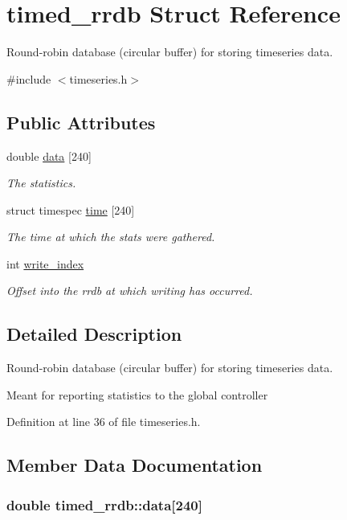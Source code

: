 \hypertarget{structtimed__rrdb}{\section{timed\-\_\-rrdb Struct Reference}
\label{structtimed__rrdb}
}


Round-\/robin database (circular buffer) for storing timeseries data.  




{\ttfamily \#include $<$timeseries.\-h$>$}

\subsection*{Public Attributes}
\begin{DoxyCompactItemize}
\item 
double \hyperlink{structtimed__rrdb_af2d8f1edb6d62eb38ce97d8f65570182}{data} \mbox{[}240\mbox{]}
\begin{DoxyCompactList}\small\item\em The statistics. \end{DoxyCompactList}\item 
struct timespec \hyperlink{structtimed__rrdb_abcf16b68b8b0bb8eb6a3c1e266b4c2f8}{time} \mbox{[}240\mbox{]}
\begin{DoxyCompactList}\small\item\em The time at which the stats were gathered. \end{DoxyCompactList}\item 
int \hyperlink{structtimed__rrdb_ab0c1ce0ef397283f1f93ed5d03583bab}{write\-\_\-index}
\begin{DoxyCompactList}\small\item\em Offset into the rrdb at which writing has occurred. \end{DoxyCompactList}\end{DoxyCompactItemize}


\subsection{Detailed Description}
Round-\/robin database (circular buffer) for storing timeseries data. 

Meant for reporting statistics to the global controller 

Definition at line 36 of file timeseries.\-h.



\subsection{Member Data Documentation}
\hypertarget{structtimed__rrdb_af2d8f1edb6d62eb38ce97d8f65570182}{
\subsubsection[{data}]{\setlength{\rightskip}{0pt plus 5cm}double timed\-\_\-rrdb\-::data\mbox{[}240\mbox{]}}}\label{structtimed__rrdb_af2d8f1edb6d62eb38ce97d8f65570182}


